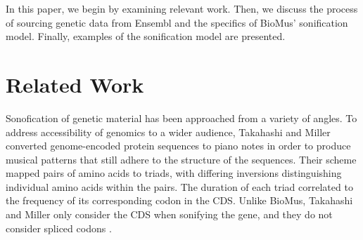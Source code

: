 \documentclass[letterpaper]{article}
\begin{document}





In this paper, we begin by examining relevant work. Then, we discuss the process of sourcing genetic data from Ensembl and the specifics of BioMus' sonification model. Finally, examples of the sonification model are presented. 

\section{Related Work}

Sonofication of genetic material has been approached from a variety of angles. To address accessibility of genomics to a wider audience, Takahashi and Miller converted genome-encoded protein sequences to piano notes in order to produce musical patterns that still adhere to the structure of the sequences. Their scheme mapped pairs of amino acids to triads, with differing inversions distinguishing individual amino acids within the pairs. The duration of each triad correlated to the frequency of its corresponding codon in the CDS. Unlike BioMus, Takahashi and Miller only consider the CDS when sonifying the gene, and they do not consider spliced codons \cite{takahashi_miller_2007}. 
\end{document}
